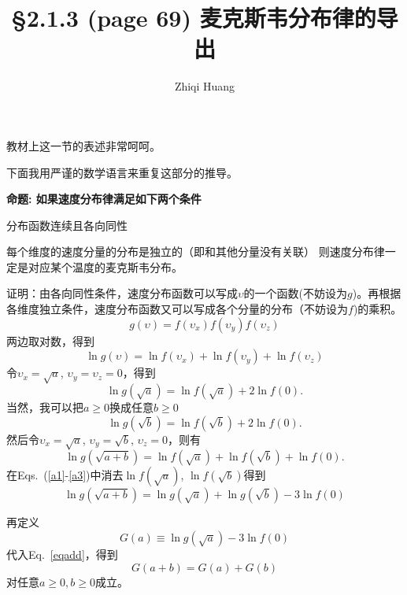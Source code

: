 \documentclass[12pt,CJK]{article}
\begin{document}
\bch
\title{\S2.1.3 (page 69) 麦克斯韦分布律的导出}
\author{Zhiqi Huang}
\date{}
\maketitle
教材上这一节的表述非常呵呵。


下面我用严谨的数学语言来重复这部分的推导。

{\bf 命题: 如果速度分布律满足如下两个条件
\bitem
\item{分布函数连续且各向同性}
\item{每个维度的速度分量的分布是独立的（即和其他分量没有关联）}
\eitem
则速度分布律一定是对应某个温度的麦克斯韦分布。}

证明：由各向同性条件，速度分布函数可以写成$\upsilon$的一个函数(不妨设为$g$)。再根据各维度独立条件，速度分布函数又可以写成各个分量的分布（不妨设为$f$)的乘积。
  \begin{equation}
  g(\upsilon) = f(\upsilon_x)f(\upsilon_y)f(\upsilon_z)
  \end{equation}
  两边取对数，得到
  \begin{equation}
  \ln g(\upsilon) =\ln f(\upsilon_x)+ \ln f(\upsilon_y)+ \ln f(\upsilon_z)
  \end{equation}
  令$\upsilon_x=\sqrt{a}$, $\upsilon_y=\upsilon_z=0$，得到
  \begin{equation}
  \ln g(\sqrt{a}) = \ln f(\sqrt{a}) + 2 \ln f(0). \label{a1}
  \end{equation}
  当然，我可以把$a\ge 0$换成任意$b\ge 0$
  \begin{equation}
  \ln g(\sqrt{b}) = \ln f(\sqrt{b}) + 2 \ln f(0). \label{a2}
  \end{equation}
  然后令$\upsilon_x= \sqrt{a}$, $\upsilon_y=\sqrt{b}$, $\upsilon_z=0$，则有
  \begin{equation}
  \ln g(\sqrt{a+b}) =  \ln f(\sqrt{a}) + \ln f(\sqrt{b}) + \ln f(0). \label{a3}
  \end{equation}
  在Eqs.~(\ref{a1}-\ref{a3})中消去$\ln f(\sqrt{a})$, $\ln f(\sqrt{b})$得到
  \begin{equation}
    \ln g(\sqrt{a+b}) = \ln g(\sqrt{a}) + \ln g(\sqrt{b})- 3\ln f(0) \label{eqadd}    
  \end{equation}
  
  再定义
  \begin{equation}
  G(a)\equiv \ln g(\sqrt{a}) - 3 \ln f(0) \label{eq:def}
  \end{equation}
  代入Eq.~\eqref{eqadd}，得到
  \begin{equation}
  G(a+b) = G(a)+G(b) \label{eq0}
  \end{equation}
  对任意$a\ge 0, b\ge 0$成立。
  
\end{document}
